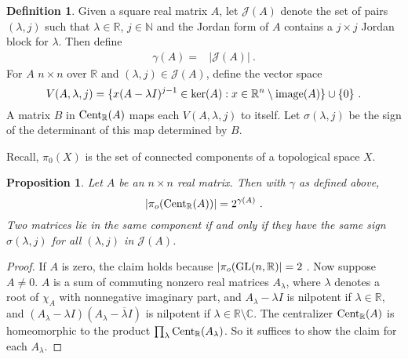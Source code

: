 \documentclass{amsart}
\newtheorem{proposition}[theorem]{Proposition}
\theoremstyle{definition}
\newtheorem{definition}[theorem]{Definition}
\theoremstyle{remark}
\numberwithin{equation}{section}
\begin{document}
{{\begin{definition} \label{gamma}
Given a square real matrix $A$, 
let $\mathcal J(A)$ denote the set of pairs 
$(\lambda, j)$ such that $ \lambda \in \mathbb R$, 
$j\in \mathbb N$ and the Jordan form of $A$ contains a 
$j\times j$ Jordan block for $\lambda$. Then define   
\begin{align*} 
\gamma (A) =& |\mathcal J(A)| 
\ .
\end{align*} 
For $A$ $n\times n$ over $\mathbb R$ 
and $(\lambda ,j)\in \mathcal J(A)$, define 
the vector space 
\[
V(A,\lambda, j) =
\{ x(A-\lambda I)^{j-1} \in \textnormal{ker}(A): 
x\in \mathbb R^n\setminus \textnormal{image}(A)\}\cup \{0\} \ .
\]
A matrix $B$ in ${\textnormal{Cent}_{\mathbb R}(A)}$ maps each  
$V(A,\lambda, j)$ to itself. Let $\sigma (\lambda ,j)$ be the sign of the
determinant of this map determined by $B$. 
\end{definition} 

Recall, $\pi_0(X)$ is the set of connected components of a topological 
space $X$. 
\begin{proposition} \label{gammabound}
Let $A$ be an $n\times n$ real matrix. Then with $\gamma $ as defined above, 
\[
|\pi_o({\textnormal{Cent}_{\mathbb R}(A)} )| = 2^{\gamma (A)} \ . 
\] 
Two matrices lie in the same component if and only if 
they have the same sign $\sigma(\lambda ,j)$ for all
$(\lambda ,j)$ in $\mathcal J(A)$.
\end{proposition} 
\begin{proof} 
If $A$ is zero, the claim holds because 
$|\pi_o(\textnormal{GL}(n,\mathbb R )| = 2 \ $. Now suppose $A\neq 0$. 
$A$ is a  sum 
of commuting nonzero real matrices $A_{\lambda}$, where $\lambda $ denotes 
a root of $\chi_A$ with nonnegative imaginary part, and 
$A_{\lambda}-\lambda I$ is nilpotent if $ \lambda \in \mathbb R$,  
and $(A_{\lambda}-\lambda I)(A_{\lambda}-\overline{\lambda }I)$ 
is nilpotent if $\lambda \in \mathbb R \setminus \mathbb C$. The 
centralizer ${\textnormal{Cent}_{\mathbb R}(A)}$ is homeomorphic to the product 
$\prod_{\lambda}\textnormal{Cent}_{\mathbb R}(A_{\lambda})$. So it 
suffices to show the claim for each $A_{\lambda}$. 


\end{proof}}}
\end{document}
